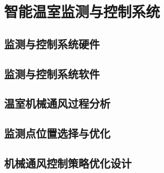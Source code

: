 

\chapter{智能温室监测与控制系统}
\label{chapter:IntelligentGreenhouseSystem}

\section{监测与控制系统硬件}

\section{监测与控制系统软件}

\section{温室机械通风过程分析}

\section{监测点位置选择与优化}

\section{机械通风控制策略优化设计}


